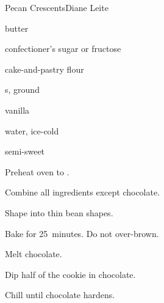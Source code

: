 \begin{recipe}{Pecan Crescents}{Diane Leite}{}

\begin{ingredients}
\item \lbs{\half} butter
\item \C{\half} confectioner's sugar or fructose
\item {} cake-and-pastry flour
\item {} s, ground
\item {} vanilla
\item {} water, ice-cold
\item semi-sweet 
\end{ingredients}

\begin{directions}
\item Preheat oven to .
\item Combine all ingredients except chocolate.
\item Shape into thin bean shapes.
\item Bake for 25~minutes. Do not over-brown.
\item Melt chocolate.
\item Dip half of the cookie in chocolate.
\item Chill until chocolate hardens.
\end{directions}

\end{recipe}
